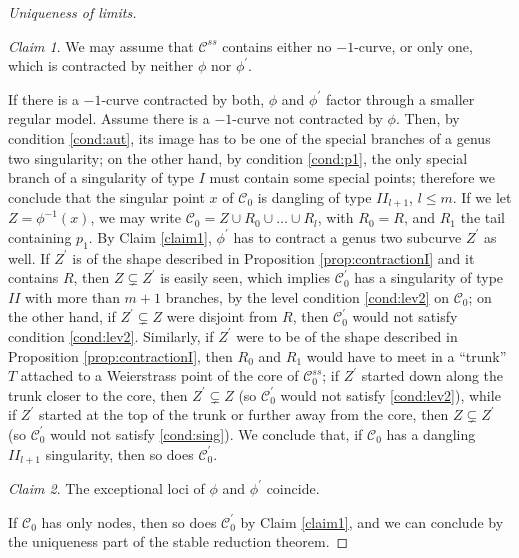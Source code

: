 \documentclass{compositio}
\theoremstyle{plain}
\theoremstyle{definition}
\theoremstyle{remark}
\newtheorem{claim}{Claim}
\begin{document}
\begin{proof}[Uniqueness of limits]
 \begin{claim}\label{claim2} We may assume that $\mathcal C^{ss}$ contains either no $-1$-curve, or only one, which is contracted by neither $\phi$ nor $\phi^\prime$.\end{claim}
 
 If there is a $-1$-curve contracted by both, $\phi$ and $\phi^\prime$ factor through a smaller regular model. Assume there is a $-1$-curve not contracted by $\phi$. Then, by condition \eqref{cond:aut}, its image has to be one of the special branches of a genus two singularity; on the other hand, by condition \eqref{cond:p1}, the only special branch of a singularity of type $I$ must contain some special points; therefore we conclude that the singular point $x$ of $\mathcal C_0$ is dangling of type $I\!I_{l+1}$, $l\leq m$. If we let $Z=\phi^{-1}(x)$, we may write $\mathcal C_0=Z\cup R_0\cup\ldots\cup R_l$, with $R_0=R$, and $R_1$ the tail containing $p_1$. 
 By Claim \ref{claim1}, $\phi^\prime$ has to contract a genus two subcurve $Z^\prime$ as well. If $Z^\prime$ is of the shape described in Proposition \ref{prop:contractionI} and it contains $R$, then $Z\subsetneq Z^\prime$ is easily seen, which implies $\mathcal C^\prime_0$ has a singularity of type $I\!I$ with more than $m+1$ branches, by the level condition \eqref{cond:lev2} on $\mathcal C_0$; on the other hand, if $Z^\prime\subsetneq Z$ were disjoint from $R$, then $\mathcal C^\prime_0$ would not satisfy condition \eqref{cond:lev2}. Similarly, if $Z^\prime$ were to be of the shape described in Proposition \ref{prop:contractionI}, then $R_0$ and $R_1$ would have to meet in a ``trunk'' $T$ attached to a Weierstrass point of the core of $\mathcal C_0^{ss}$; if $Z^\prime$ started down along the trunk closer to the core, then $Z^\prime\subsetneq Z$ (so $\mathcal C^\prime_0$ would not satisfy \eqref{cond:lev2}), while if $Z^\prime$ started at the top of the trunk or further away from the core, then $Z\subsetneq Z^\prime$ (so $\mathcal C^\prime_0$ would not satisfy \eqref{cond:sing}). We conclude that, if $\mathcal C_0$ has a dangling $I\!I_{l+1}$ singularity, then so does $\mathcal C^\prime_0$.
 
 \begin{claim} The exceptional loci of $\phi$ and $\phi^\prime$ coincide. \end{claim}
 
 If $\mathcal C_0$ has only nodes, then so does $\mathcal C^\prime_0$ by Claim \ref{claim1}, and we can conclude by the uniqueness part of the stable reduction theorem.
 

\end{proof}
\end{document}
